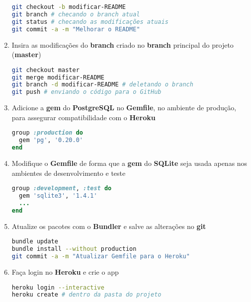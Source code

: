 \documentclass[a4paper,12pt]{article}
\begin{document}
\begin{enumerate}
    \begin{lstlisting}[language=Bash, commentstyle=\color{gray}]
git checkout -b modificar-README
git branch # checando o branch atual
git status # checando as modificações atuais
git commit -a -m "Melhorar o README"
    \end{lstlisting}

  \item Insira as modificações do \textbf{branch} criado no \textbf{branch} principal do projeto (\textbf{master})

    \begin{lstlisting}[language=Bash, commentstyle=\color{gray}]
git checkout master
git merge modificar-README
git branch -d modificar-README # deletando o branch
git push # enviando o código para o GitHub
    \end{lstlisting}

  \item Adicione a \textbf{gem} do \textbf{PostgreSQL} no \textbf{Gemfile}, no ambiente de produção, para assegurar compatibilidade com o \textbf{Heroku}

    \begin{lstlisting}[language=Ruby, title=Gemfile]
group :production do
  gem 'pg', '0.20.0'
end
    \end{lstlisting}

  \item Modifique o \textbf{Gemfile} de forma que a \textbf{gem} do \textbf{SQLite} seja usada apenas nos ambientes de desenvolvimento e teste

    \begin{lstlisting}[language=Ruby, title=Gemfile]
group :development, :test do
  gem 'sqlite3', '1.4.1'
  ...
end
    \end{lstlisting}

  \item Atualize os pacotes com o \textbf{Bundler} e salve as alterações no \textbf{git}

    \begin{lstlisting}[language=Bash, commentstyle=\color{gray}]
bundle update
bundle install --without production
git commit -a -m "Atualizar Gemfile para o Heroku"
    \end{lstlisting}

  \item Faça login no \textbf{Heroku} e crie o app

    \begin{lstlisting}[language=Bash, commentstyle=\color{gray}]
heroku login --interactive
heroku create # dentro da pasta do projeto
    \end{lstlisting}


\end{enumerate}
\end{document}
